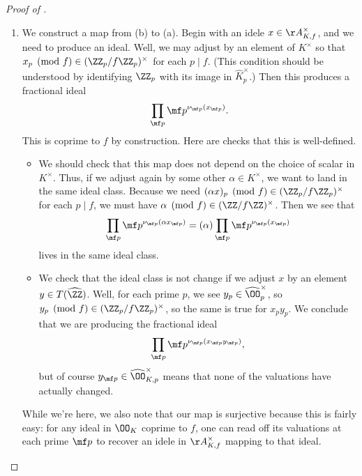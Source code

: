 \documentclass[../notes.tex]{subfiles}
\begin{document}
\begin{proof}[Proof of ]
\begin{enumerate}
		\item We construct a map from (b) to (a). Begin with an idele $x\in\AA_{K,f}^\times$, and we need to produce an ideal. Well, we may adjust by an element of $K^\times$ so that $x_p\pmod f\in(\ZZ_p/f\ZZ_p)^\times$ for each $p\mid f$. (This condition should be understood by identifying $\ZZ_p$ with its image in $\widehat K^\times_p$.) Then this produces a fractional ideal
		\[\prod_{\mf p}\mf p^{\nu_{\mf p}(x_{\mf p})}.\]
		This is coprime to $f$ by construction. Here are checks that this is well-defined.
		\begin{itemize}
			\item We should check that this map does not depend on the choice of scalar in $K^\times$. Thus, if we adjust again by some other $\alpha\in K^\times$, we want to land in the same ideal class. Because we need $(\alpha x)_p\pmod f\in(\ZZ_p/f\ZZ_p)^\times$ for each $p\mid f$, we must have $\alpha\pmod f\in(\ZZ/f\ZZ)^\times$. Then we see that
			\[\prod_{\mf p}\mf p^{\nu_{\mf p}(\alpha x_{\mf p})}=(\alpha)\prod_{\mf p}\mf p^{\nu_{\mf p}(x_{\mf p})}\]
			lives in the same ideal class.
			\item We check that the ideal class is not change if we adjust $x$ by an element $y\in T(\widehat\ZZ)$. Well, for each prime $p$, we see $y_p\in\widehat\OO_p^\times$, so $y_p\pmod f\in(\ZZ_p/f\ZZ_p)^\times$, so the same is true for $x_py_p$. We conclude that we are producing the fractional ideal
			\[\prod_{\mf p}\mf p^{\nu_{\mf p}(x_{\mf p}y_{\mf p})},\]
			but of course $y_{\mf p}\in\widehat\OO_{K,p}^\times$ means that none of the valuations have actually changed.
		\end{itemize}
		While we're here, we also note that our map is surjective because this is fairly easy: for any ideal in $\OO_K$ coprime to $f$, one can read off its valuations at each prime $\mf p$ to recover an idele in $\AA_{K,f}^\times$ mapping to that ideal.


\end{enumerate}
\end{proof}
\end{document}
